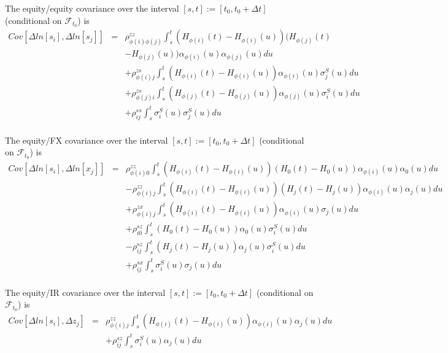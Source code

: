 \documentclass[12pt, a4paper]{article}
\begin{document}
{{\begin{appendix}
The equity/equity covariance over the interval $[s,t] := [t_0, t_0+\Delta t]$ (conditional on $\mathcal{F}_{t_0}$) is
\begin{eqnarray*}
	Cov \left[\Delta ln[s_i], \Delta ln[s_j] \right] &=&
	\rho_{\phi(i) \phi(j)}^{zz}\int_s^t (H_{\phi(i)} (t) - H_{\phi(i)} (u)) (H_{\phi(j)} (t)\\
	&& - H_{\phi(j)} (u)) \alpha_{\phi(i)}(u) \alpha_{\phi(j)}(u) du\\
	&&+ \rho_{\phi(i) j}^{zs} \int_s^t (H_{\phi(i)} (t) - H_{\phi(i)} (u)) \alpha_{\phi(i)}(u) \sigma_j^S(u) du\\
	&&+ \rho_{\phi(j) i}^{zs} \int_s^t (H_{\phi(j)} (t) - H_{\phi(j)} (u)) \alpha_{\phi(j)}(u) \sigma_i^S(u) du\\
	&&+ \rho_{ij}^{ss} \int_s^t \sigma_i^S(u) \sigma_j^S(u) du\\
\end{eqnarray*}

The equity/FX covariance over the interval $[s,t] := [t_0, t_0+\Delta t]$ (conditional on $\mathcal{F}_{t_0}$) is
\begin{eqnarray*}
	Cov \left[\Delta ln[s_i], \Delta ln[x_j] \right] &=&
	\rho_{\phi(i)0}^{zz} \int_s^t (H_{\phi(i)} (t) - H_{\phi(i)} (u)) (H_0 (t) - H_0 (u)) \alpha_{\phi(i)}(u) 
	\alpha_0(u) 
	du\\
	&& - \rho_{\phi(i)j}^{zz} \int_s^t (H_{\phi(i)} (t) - H_{\phi(i)} (u)) (H_j (t) - H_j (u)) \alpha_{\phi(i)} 
	(u)\alpha_j(u) du\\
	&& + \rho_{\phi(i)j}^{zx} \int_s^t (H_{\phi(i)} (t) - H_{\phi(i)} (u)) \alpha_{\phi(i)} (u) \sigma_j(u) du\\
	&&+ \rho_{i0}^{sz} \int_s^t (H_0 (t) - H_0 (u)) \alpha_0 (u) \sigma_i^S(u) du\\
	&&- \rho_{ij}^{sz} \int_s^t (H_j (t) - H_j (u)) \alpha_j (u) \sigma_i^S(u) du\\
	&&+ \rho_{ij}^{sx} \int_s^t \sigma_i^S(u) \sigma_j(u) du\\
\end{eqnarray*}

The equity/IR covariance over the interval $[s,t] := [t_0, t_0+\Delta t]$ (conditional on $\mathcal{F}_{t_0}$) is
\begin{eqnarray*}
	Cov \left[\Delta ln[s_i], \Delta z_j \right] &=&
	\rho_{\phi(i)j}^{zz} \int_s^t (H_{\phi(i)} (t) - H_{\phi(i)} (u)) \alpha_{\phi(i)} (u) \alpha_j (u) du\\
	&&+ \rho_{ij}^{sz} \int_s^t \sigma_i^S (u) \alpha_j (u) du\\
\end{eqnarray*}


\end{appendix}}}
\end{document}
